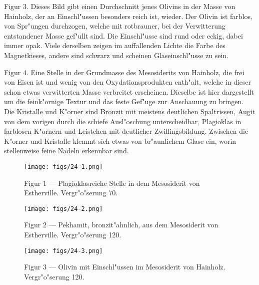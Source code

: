 \documentclass[a4paper, 11pt, oneside, polutonikogreek, german]{article}
\begin{document}
Figur 3. Dieses Bild gibt einen Durchschnitt jenes Olivins in der Masse von Hainholz, der an Einschl"ussen besonders reich ist, wieder. Der Olivin ist farblos, von Spr"ungen durchzogen, welche mit rotbrauner, bei der Verwitterung entstandener Masse gef"ullt sind. Die Einschl"usse sind rund oder eckig, dabei immer opak. Viele derselben zeigen im auffallenden Lichte die Farbe des Magnetkieses, andere sind schwarz und scheinen Glaseinschl"usse zu sein.

Figur 4. Eine Stelle in der Grundmasse des Mesosiderits von Hainholz, die frei von Eisen ist und wenig von den Oxydationsprodukten enth"alt, welche in dieser schon etwas verwitterten Masse verbreitet erscheinen. Dieselbe ist hier dargestellt um die feink"ornige Textur und das feste Gef"uge zur Anschauung zu bringen. Die Kristalle und K"orner sind Bronzit mit meistens deutlichen Spaltrissen, Augit von dem vorigen durch die schiefe Ausl"oschung unterscheidbar, Plagioklas in farblosen K"ornern und Leistchen mit deutlicher Zwillingsbildung. Zwischen die K"orner und Kristalle klemmt sich etwas von br"aunlichem Glase ein, worin stellenweise feine Nadeln erkennbar sind.
\clearpage

\vspace*{\fill}
\begin{figure}[H]
\centering
\texttt{[image: figs/24-1.png]}
\caption{\small Figur 1 --- Plagioklasreiche Stelle in dem Mesosiderit von Estherville. Vergr"o"serung 70.}
\end{figure}
\vspace*{\fill}
\clearpage

\vspace*{\fill}
\begin{figure}[H]
\centering
\texttt{[image: figs/24-2.png]}
\caption{\small Figur 2 --- Pekhamit, bronzit"ahnlich, aus dem Mesosiderit von Estherville. Vergr"o"serung 120.}
\end{figure}
\vspace*{\fill}
\clearpage

\vspace*{\fill}
\begin{figure}[H]
\centering
\texttt{[image: figs/24-3.png]}
\caption{\small Figur 3 --- Olivin mit Einschl"ussen im Mesosiderit von Hainholz. Vergr"o"serung 120.}
\end{figure}
\vspace*{\fill}
\clearpage
\end{document}
